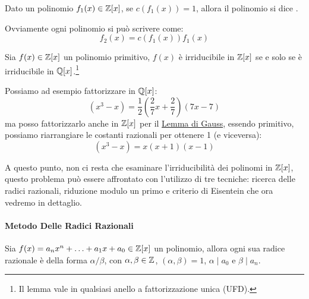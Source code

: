 \documentclass[11pt]{scrartcl}
\begin{document}
\begin{definition}
Dato un polinomio $f_1(x) \in \mathbb Z[x]$, se $c(f_1(x)) = 1$, allora il polinomio si dice .
\end{definition}

Ovviamente ogni polinomio si può scrivere come:
	\[ f_2(x) = c(f_1(x))f_1(x)
	\]

\begin{lemma}
\label{p:Gauss}
Sia $f(x) \in \mathbb Z[x]$ un polinomio primitivo, $f(x)$ è irriducibile in $\mathbb Z[x]$ se e solo se è irriducibile in $\mathbb Q[x]$.\footnote{Il lemma vale in qualsiasi anello a fattorizzazione unica (UFD).}
\end{lemma}

\begin{example}
Possiamo ad esempio fattorizzare in $\mathbb Q[x]$:
	\[ (x^3 - x) = \frac 12\left(\frac 27x + \frac 27 \right) (7x -7)
	\]
ma posso fattorizzarlo anche in $\mathbb Z[x]$ per il \hyperref[p:Gauss]{Lemma di Gauss}, essendo primitivo, possiamo riarrangiare le costanti razionali per ottenere 1 (e viceversa):
	\[ (x^3 - x) = x(x+1)(x-1)
	\]
\end{example}

A questo punto, non ci resta che esaminare l'irriducibilità dei polinomi in $\mathbb Z[x]$, questo problema può essere affrontato con l'utilizzo di tre tecniche: ricerca delle radici razionali, riduzione modulo un primo e criterio di Eisentein che ora vedremo in dettaglio.

\paragraph{Metodo Delle Radici Razionali}
\begin{theorem}
Sia $f(x) = a_nx^n + \ldots + a_1x + a_0 \in \mathbb Z[x]$ un polinomio, allora ogni sua radice razionale è della forma $\alpha/\beta$, con $\alpha,\beta \in \mathbb Z$, $(\alpha,\beta) = 1$, $\alpha \mid a_0$ e $\beta \mid a_n$.
\end{theorem}
\end{document}
